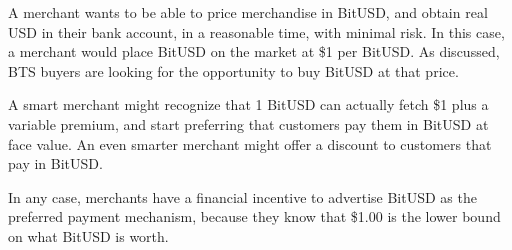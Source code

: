 A merchant wants to be able to price merchandise in BitUSD, and obtain real USD
in their bank account, in a reasonable time, with minimal risk. In this case, a
merchant would place BitUSD on the market at \$1 per BitUSD. As discussed, BTS
buyers are looking for the opportunity to buy BitUSD at that price.

A smart merchant might recognize that 1 BitUSD can actually fetch \$1 plus a
variable premium, and start preferring that customers pay them in BitUSD at
face value. An even smarter merchant might offer a discount to customers that
pay in BitUSD.

In any case, merchants have a financial incentive to advertise BitUSD as the
preferred payment mechanism, because they know that \$1.00 is the lower bound
on what BitUSD is worth.
